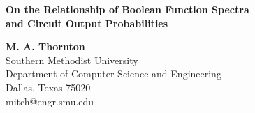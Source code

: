 \begin{center}
{\Large \bf On the Relationship of Boolean Function Spectra \\
and Circuit Output Probabilities}
\end{center}

\begin{center}
{\bf  M. A. Thornton} \\
Southern Methodist University \\
Department of Computer Science and Engineering \\
Dallas, Texas 75020 \\
mitch@engr.smu.edu
\end{center}
